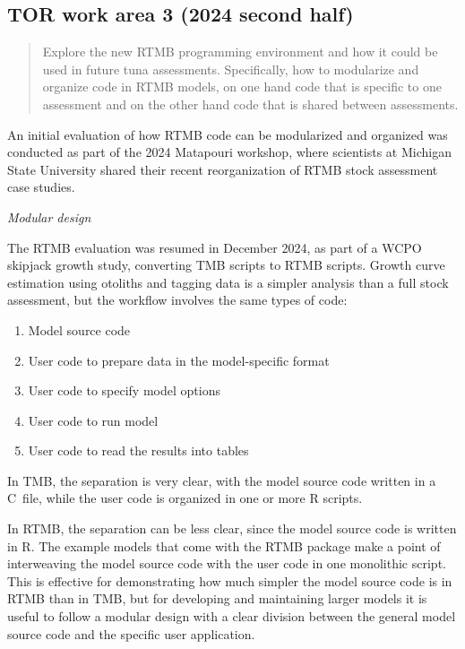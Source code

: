 \documentclass{SCreport}
\newcommand\cpp{\mbox{C\raisebox{0.5ex}{\tiny\bfseries ++}}}
\begin{document}
\hypertarget{link:tor-3}{}
\subsection{TOR work area 3 (2024 second half)}
\label{sec:tor-3}

\begin{quote}\sf
  Explore the new RTMB programming environment and how it could be used in
  future tuna assessments. Specifically, how to modularize and organize code in
  RTMB models, on one hand code that is specific to one assessment and on the
  other hand code that is shared between assessments.
\end{quote}

\vspace{2ex}

An initial evaluation of how RTMB code can be modularized and organized was
conducted as part of the 2024 Matapouri workshop, where scientists at Michigan
State University shared their recent reorganization of RTMB stock assessment
case studies.

\textit{Modular design}

The RTMB evaluation was resumed in December 2024, as part of a WCPO skipjack
growth study, converting TMB scripts to RTMB scripts. Growth curve estimation
using otoliths and tagging data is a simpler analysis than a full stock
assessment, but the workflow involves the same types of code:

\begin{enumerate}
  \item Model source code\\[-4.5ex]
  \item User code to prepare data in the model-specific format\\[-4.5ex]
  \item User code to specify model options\\[-4.5ex]
  \item User code to run model\\[-4.5ex]
  \item User code to read the results into tables\\[-2.5ex]
\end{enumerate}

In TMB, the separation is very clear, with the model source code written in a
\cpp\ file, while the user code is organized in one or more R scripts.

In RTMB, the separation can be less clear, since the model source code is
written in R. The example models that come with the RTMB package make a point of
interweaving the model source code with the user code in one monolithic script.
This is effective for demonstrating how much simpler the model source code is in
RTMB than in TMB, but for developing and maintaining larger models it is useful
to follow a modular design with a clear division between the general model
source code and the specific user application.
\end{document}
